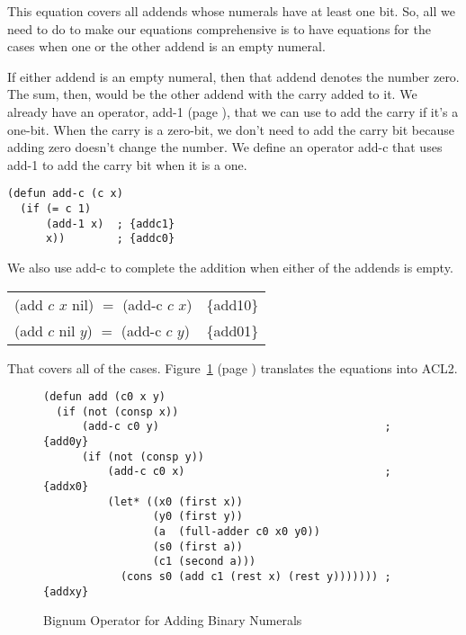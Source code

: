This equation covers all addends whose numerals have at least one bit.
So, all we need to do to make our equations comprehensive
is to have equations for the cases when one or the other addend is an empty numeral.

If either addend is an empty numeral, then that addend denotes the number zero.
The sum, then, would be the other addend with the carry added to it.
We already have an operator, \textsf{add-1} (page \pageref{add-1-defun}),
that we can use to add the carry if it's a one-bit.
When the carry is a zero-bit, we don't need to add the carry bit
because adding zero doesn't change the number.
We define an operator \textsf{add-c} that uses \textsf{add-1} to add the carry bit
when it is a one.

\label{add-c-defun} 
\begin{Verbatim}
(defun add-c (c x)
  (if (= c 1)
      (add-1 x)  ; {addc1}
      x))        ; {addc0}
\end{Verbatim}

We also use \textsf{add-c }to complete the addition when either of the addends is empty.
\begin{center}
\begin{tabular}{ll}
\textsf{(add $c$ $x$ nil)} $=$ \textsf{(add-c $c$ $x$)}   & \{add10\} \\
\textsf{(add $c$ nil $y$)} $=$ \textsf{(add-c $c$ $y$)}   & \{add01\} \\
\end{tabular}
\end{center}

That covers all of the cases.
Figure~\ref{fig:bignum-add-defun} (page \pageref{fig:bignum-add-defun})
translates the equations into ACL2.

\begin{figure}
\begin{Verbatim}
(defun add (c0 x y)
  (if (not (consp x))
      (add-c c0 y)                                   ; {add0y}
      (if (not (consp y))
          (add-c c0 x)                               ; {addx0}
          (let* ((x0 (first x))
                 (y0 (first y))
                 (a  (full-adder c0 x0 y0))
                 (s0 (first a))
                 (c1 (second a)))
            (cons s0 (add c1 (rest x) (rest y))))))) ; {addxy}
\end{Verbatim}
\caption{Bignum Operator for Adding Binary Numerals}
\label{fig:bignum-add-defun}
\end{figure}

